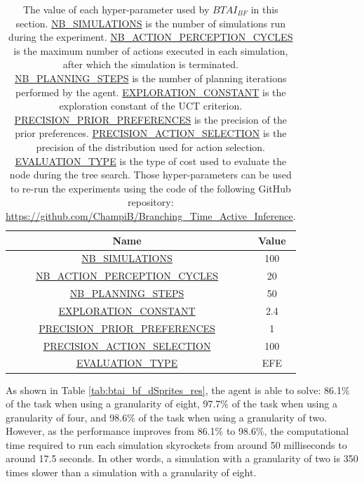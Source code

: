 \documentclass[twoside,11pt]{article}
\begin{document}
\begin{table}[H]
\centering
\begin{tabular}{ |c|c|  }
 \hline
 Name & Value\\
 \hline
 \hline
 \url{NB_SIMULATIONS} & 100\\
 \hline
 \url{NB_ACTION_PERCEPTION_CYCLES} & 20\\
 \hline
 \url{NB_PLANNING_STEPS} & 50\\
 \hline
 \url{EXPLORATION_CONSTANT} & 2.4\\
 \hline
 \url{PRECISION_PRIOR_PREFERENCES} & 1\\
 \hline
 \url{PRECISION_ACTION_SELECTION} & 100\\
 \hline
 \url{EVALUATION_TYPE} & EFE\\
 \hline
\end{tabular}
\caption{The value of each hyper-parameter used by $BTAI_{BF}$ in this section. \url{NB_SIMULATIONS} is the number of simulations run during the experiment. \url{NB_ACTION_PERCEPTION_CYCLES} is the maximum number of actions executed in each simulation, after which the simulation is terminated. \url{NB_PLANNING_STEPS} is the number of planning iterations performed by the agent. \url{EXPLORATION_CONSTANT} is the exploration constant of the UCT criterion. \url{PRECISION_PRIOR_PREFERENCES} is the precision of the prior preferences. \url{PRECISION_ACTION_SELECTION} is the precision of the distribution used for action selection. \url{EVALUATION_TYPE} is the type of cost used to evaluate the node during the tree search. Those hyper-parameters can be used to re-run the experiments using the code of the following GitHub repository: \url{https://github.com/ChampiB/Branching_Time_Active_Inference}.}
\label{tab:values_hp_BTAI_BF_dSprites}
\end{table}

As shown in Table \ref{tab:btai_bf_dSprites_res}, the agent is able to solve: 86.1\% of the task when using a granularity of eight, 97.7\% of the task when using a granularity of four, and 98.6\% of the task when using a granularity of two. However, as the performance improves from 86.1\% to 98.6\%, the computational time required to run each simulation skyrockets from around 50 milliseconds to around 17.5 seconds. In other words, a simulation with a granularity of two is 350 times slower than a simulation with a granularity of eight.
\end{document}
